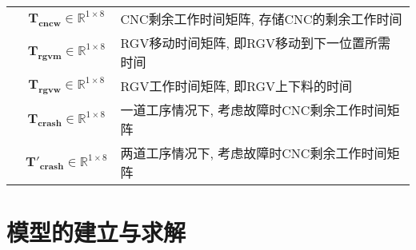 \documentclass[no-math,withoutpreface,bwprint]{cumcmthesis} %
\newcounter{rowno}
\numberwithin{equation}{section}
\numberwithin{figure}{section}
\numberwithin{table}{section}
\begin{document}
\begin{center}
\begin{table}[H]
\begin{tabular}{>{\stepcounter{rowno}\therowno}ccl}
 &$\mathbf{T_{cncw}}\in\mathbb{R}^{1\times8}$ & CNC剩余工作时间矩阵, 存储CNC的剩余工作时间  \\ 
 & $\mathbf{T_{rgvm}}\in\mathbb{R}^{1\times8}$  & RGV移动时间矩阵, 即RGV移动到下一位置所需时间  \\ 
&$\mathbf{T_{rgvw}}\in\mathbb{R}^{1\times8}$   & RGV工作时间矩阵, 即RGV上下料的时间  \\  
& $\mathbf{T_{crash}}\in\mathbb{R}^{1\times8}$ & 一道工序情况下, 考虑故障时CNC剩余工作时间矩阵 \\
& $\mathbf{T'_{crash}}\in\mathbb{R}^{1\times8}$ & 两道工序情况下, 考虑故障时CNC剩余工作时间矩阵 \\
\bottomrule[1.5pt]
\end{tabular}
\end{table}
\end{center}


\vspace{-1.5cm}

\section{模型的建立与求解}
\end{document}
